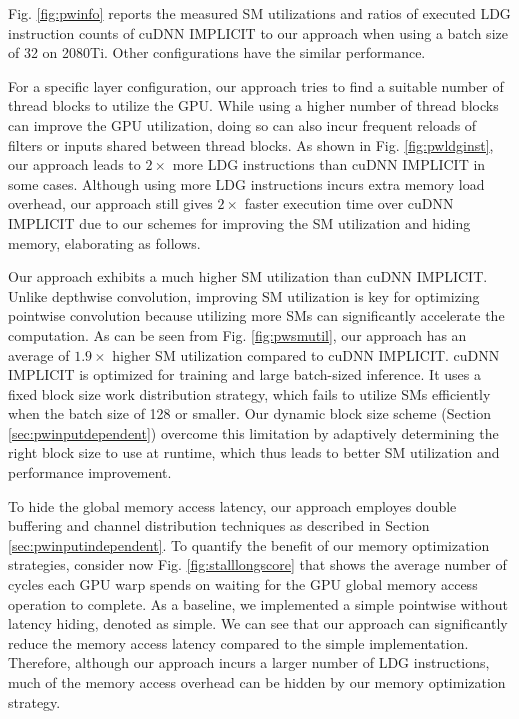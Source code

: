 Fig. \ref{fig:pwinfo} reports the measured SM utilizations and ratios of executed LDG instruction counts of cuDNN IMPLICIT to our approach when using a batch size of 32 on 2080Ti. Other configurations have the similar performance.


For a specific layer configuration, our approach tries to find a suitable number of thread blocks to utilize the GPU. While using a higher
number of thread blocks can improve the GPU utilization, doing so can also incur frequent reloads of filters or inputs shared between
thread blocks. As shown in Fig. \ref{fig:pwldginst}, our approach leads to $2\times$ more LDG instructions than cuDNN IMPLICIT in some
cases. Although using more LDG instructions incurs extra memory load overhead, our approach still gives $2\times$ faster execution time
over cuDNN IMPLICIT due to our schemes for improving the SM utilization and hiding memory, elaborating as follows.


Our approach exhibits a much higher SM utilization than cuDNN IMPLICIT. Unlike depthwise convolution, improving SM utilization is key for
optimizing pointwise convolution because utilizing more SMs can significantly accelerate the computation.	As can be seen from Fig.
\ref{fig:pwsmutil}, our approach has an average of $1.9\times$ higher SM utilization compared to cuDNN IMPLICIT. cuDNN IMPLICIT is
optimized for training and large batch-sized inference. It uses a fixed block size work distribution strategy, which fails to utilize SMs
efficiently when the batch size of 128 or smaller. Our dynamic block size scheme (Section \ref{sec:pwinputdependent}) overcome this
limitation by adaptively determining the right block size to use at runtime, which thus leads to better SM utilization and performance
improvement.

To hide the global memory access latency, our approach employes double buffering and channel distribution techniques as described in
Section \ref{sec:pwinputindependent}. To quantify the benefit of our memory optimization strategies, consider now  Fig. \ref{fig:stalllongscore} that
shows the average number of cycles each GPU warp spends on waiting for the GPU global memory access operation to complete. As a baseline,
we implemented a simple pointwise without latency hiding, denoted as simple. We can see that our approach can significantly reduce the
memory access latency compared to the simple implementation. Therefore, although our approach incurs a larger number of LDG instructions,
much of the memory access overhead can be hidden by our memory optimization strategy.



